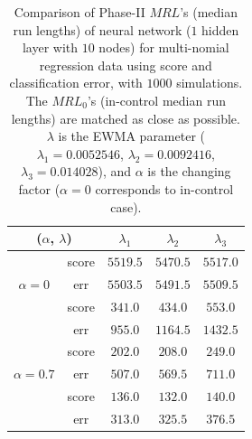 \documentclass[twoside,11pt]{article}
\begin{document}
\begin{table}[!t]
\centering
\begin{tabular}{ccccc}
\toprule
\multicolumn{2}{c}{($ \alpha$, $ \lambda$)} & {$ \lambda_1$} & {$ \lambda_2$} & {$ \lambda_3$} \\
\midrule
\multirow{3}{*}{$\alpha=0$} & score &$5519.5$ & $5470.5$ & $5517.0$ \\
& err &$5503.5$ & $5491.5$ & $5509.5$ \\
\midrule
\multirow{3}{*}{$\alpha=0.5$} & score &$ \bm{341.0}$ & $\bm{434.0}$ & $\bm{553.0}$ \\
& err &$955.0$ & $1164.5$ & $1432.5$ \\
\midrule
\multirow{3}{*}{$\alpha=0.7$} & score &$\bm{202.0}$ & $\bm{208.0}$ & $\bm{249.0}$ \\
& err &$507.0$ & $569.5$ & $711.0$ \\
\midrule
\multirow{3}{*}{$\alpha=0.9$} & score &$\bm{136.0}$ & $\bm{132.0}$ & $\bm{140.0}$ \\
& err &$313.0$ & $325.5$ & $376.5$ \\
\midrule
\end{tabular}
\caption{Comparison of Phase-II $MRL$'s (median run lengths) of neural network ($1$ hidden layer with $10$ nodes) for multi-nomial regression data using score and classification error, with $1000$ simulations. The $MRL_0$'s (in-control median run lengths) are matched as close as possible. $ \lambda$ is the EWMA parameter ({$ \lambda_1 =0.0052546$}, {$ \lambda_2=0.0092416$}, {$ \lambda_3 =0.014028$}), and $ \alpha$ is the changing factor ($ \alpha=0$ corresponds to in-control case).}
\label{tab:multi_logi_nnet_MRL}
\end{table}
\end{document}
